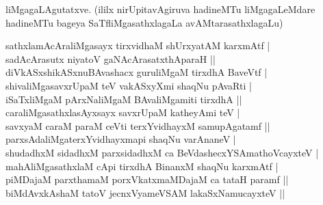 \begin{entry}
{{liMgagaLAgutatxve. (ililx nirUpitavAgiruva hadineMTu liMgagaLeMdare hadineMTu bageya
SaTfliMgasathxlagaLa avAMtarasathxlagaLu)}}
\smallskip
\begin{shl}
sathxlamAcAraliMgasayx tirxvidhaM shUrxyatAM karxmAtf |\\
sadAcArasutx niyatoV gaNAcArasatxthAparaH ||\\
diVkASxshikASxnuBAvashacx guruliMgaM tirxdhA BaveVtf |\\
shivaliMgasavxrUpaM teV vakASxyXmi shaqNu pAvaRti |\\
iSaTxliMgaM pArxNaliMgaM BAvaliMgamiti tirxdhA ||\\
caraliMgasathxlasAyxsayx savxrUpaM katheyAmi teV |\\
savxyaM caraM paraM ceVti terxYvidhayxM samupAgatamf ||\\
parxsAdaliMgaterxYvidhayxmapi shaqNu varAnaneV |\\
shudadhxM sidadhxM parxsidadhxM ca BeVdashecxYSAmathoVcayxteV |\\
mahAliMgasathxlaM cApi tirxdhA BinanxM shaqNu karxmAtf |\\
piMDajaM parxthamaM porxVkatxmaMDajaM ca tataH paramf ||\\
biMdAvxkAshaM tatoV jecnxVyameVSAM lakaSxNamucayxteV ||
\end{shl}
\medskip
{}
\end{entry}

\begin{entry}
\end{entry}

\begin{entry}
\end{entry}

